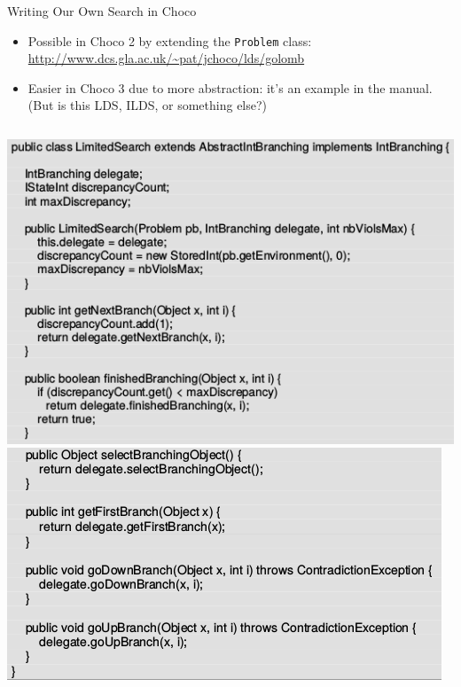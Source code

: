 \documentclass{beamer}
\begin{document}
\begin{frame}{Writing Our Own Search in Choco}
    \begin{itemize}
        \item Possible in Choco 2 by extending the \texttt{Problem} class: \\
            \url{http://www.dcs.gla.ac.uk/\~pat/jchoco/lds/golomb}
        \item Easier in Choco 3 due to more abstraction: it's an example in the manual. (But is this
            LDS, ILDS, or something else?)
    \end{itemize}

    \begin{columns}[T]
        \centering\includegraphics*[keepaspectratio=true,scale=0.3]{lds-choco3-col1.png}
        \centering\includegraphics*[keepaspectratio=true,scale=0.3]{lds-choco3-col2.png}
    \end{columns}
\end{frame}
\end{document}
